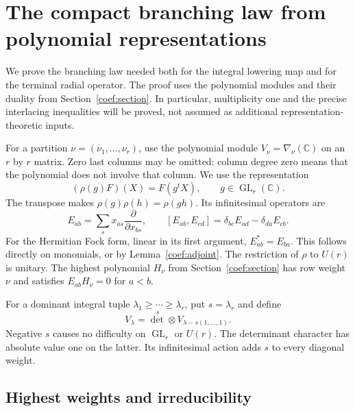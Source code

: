 \section{The compact branching law from polynomial representations}
\label{cb-section}

We prove the branching law needed both for the integral lowering map
and for the terminal radial operator.  The proof uses the polynomial
modules and their duality from Section~\ref{coef:section}.  In
particular, multiplicity one and the precise interlacing inequalities
will be proved, not assumed as additional representation-theoretic
inputs.

For a partition $\nu=(\nu_1,\ldots,\nu_r)$, use the polynomial
module $V_\nu=\nabla_\nu(\mathbb C)$ on an $r$ by $r$ matrix.
Zero last columns may be omitted: column degree zero means that
the polynomial does not involve that column.  We use the representation
\[
             (\rho(g)F)(X)=F(g^tX),\qquad g\in\operatorname{GL}_r(\mathbb C).
\]
The transpose makes $\rho(g)\rho(h)=\rho(gh)$.
Its infinitesimal operators are
\[
 E_{ab}=\sum_s x_{as}\frac{\partial}{\partial x_{bs}},
 \qquad
 [E_{ab},E_{cd}]=\delta_{bc}E_{ad}-\delta_{da}E_{cb}.
 \tag{CB1}
\]
For the Hermitian Fock form, linear in its first argument,
$E_{ab}^*=E_{ba}$.  This follows directly on monomials,
or by Lemma~\ref{coef:adjoint}.  The restriction of $\rho$ to
$U(r)$ is unitary.  The highest polynomial $H_\nu$ from
Section~\ref{coef:section} has row weight $\nu$ and satisfies
$E_{ab}H_\nu=0$ for $a<b$.

For a dominant integral tuple $\lambda_1\ge\cdots\ge\lambda_r$,
put $s=\lambda_r$ and define
\[
 V_\lambda=\det^{\,s}\otimes V_{\lambda-s(1,\ldots,1)}.
 \tag{CB2}
\]
Negative $s$ causes no difficulty on $\operatorname{GL}_r$ or $U(r)$.
The determinant character has absolute value one on the latter.
Its infinitesimal action adds $s$ to every diagonal weight.

\subsection{Highest weights and irreducibility}

